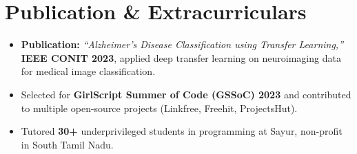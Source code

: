 \documentclass[letterpaper,10pt]{article}
\begin{document}
\section{Publication \& Extracurriculars}
\begin{itemize}[leftmargin=0.18in, itemsep=0pt, topsep=1pt]
  \item\small \textbf{Publication:} \textit{``Alzheimer's Disease Classification using Transfer Learning,''} \textbf{IEEE CONIT 2023}, applied deep transfer learning on neuroimaging data for medical image classification.
  \item\small Selected for \textbf{GirlScript Summer of Code (GSSoC) 2023} and contributed to multiple open-source projects (Linkfree, Freehit, ProjectsHut).
  \item\small Tutored \textbf{30+} underprivileged students in programming at Sayur, non-profit in South Tamil Nadu.
\end{itemize}
\vspace{-6pt}
\end{document}
